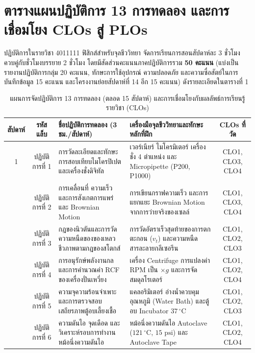 \chapter*{ตารางแผนปฏิบัติการ 13 การทดลอง และการเชื่อมโยง CLOs สู่ PLOs}

ปฏิบัติการในรายวิชา 4011111 ฟิสิกส์สำหรับจุลชีววิทยา จัดการเรียนการสอนสัปดาห์ละ 3 ชั่วโมง ควบคู่กับชั่วโมงบรรยาย 2 ชั่วโมง โดยมีสัดส่วนคะแนนภาคปฏิบัติการรวม \textbf{50 คะแนน} (แบ่งเป็น รายงานปฏิบัติการกลุ่ม 20 คะแนน, ทักษะการใช้อุปกรณ์ ความปลอดภัย และความซื่อสัตย์ในการบันทึกข้อมูล 15 คะแนน และโครงงานย่อยสัปดาห์ที่ 14 อีก 15 คะแนน) ดังรายละเอียดใน\mbox{ตารางที่} 1

\begin{table}[H]
\centering
\caption{แผนการจัดปฏิบัติการ 13 การทดลอง (ตลอด 15 สัปดาห์) และการเชื่อมโยงกับผลลัพธ์การเรียนรู้รายวิชา (CLOs)}
\scriptsize\setlength{\tabcolsep}{3.5pt}
\begin{tabularx}{\textwidth}{c c >{\raggedright\arraybackslash}p{4.4cm} >{\raggedright\arraybackslash}X c}
\toprule
\textbf{สัปดาห์} & \textbf{รหัสแล็บ} & \textbf{ชื่อปฏิบัติการทดลอง (3 ชม./สัปดาห์)} & \textbf{เครื่องมือจุลชีววิทยาและทักษะหลักที่ฝึก} & \textbf{CLOs ที่วัด} \\
\midrule
1 & ปฏิบัติการที่ 1 & การวัดละเอียดและทักษะการสอบเทียบไมโครปิเปตและเครื่องชั่งดิจิทัล & เวอร์เนียร์ ไมโครมิเตอร์ เครื่องชั่ง 4 ตำแหน่ง และ Micropipette (P200, P1000) & CLO1, CLO3, CLO4 \\
\addlinespace[1.5pt]
2 & ปฏิบัติการที่ 2 & การเคลื่อนที่ ความเร็ว และการสังเกตการแพร่และ Brownian Motion & การเขียนกราฟความเร็ว และการแยกแยะ Brownian Motion จากการว่ายจริงของเซลล์ & CLO1, CLO3, CLO4 \\
\addlinespace[1.5pt]
3 & ปฏิบัติการที่ 3 & กฎของนิวตันและการวัดความหนืดของของเหลวชีวภาพตามกฎของสโตกส์ & การวัดอัตราเร็วสุดท้ายของการตกตะกอน ($v_t$) และความหนืดสารละลายกลีเซอรีน & CLO1, CLO2, CLO3 \\
\addlinespace[1.5pt]
4 & ปฏิบัติการที่ 4 & การอนุรักษ์พลังงานกลและการคำนวณค่า RCF ของเครื่องปั่นเหวี่ยง & เครื่อง Centrifuge การแปลงค่า RPM เป็น $\times g$ และการจัดสมดุลโรเตอร์ & CLO1, CLO2, CLO4 \\
\addlinespace[1.5pt]
5 & ปฏิบัติการที่ 5 & ความจุความร้อนจำเพาะและการตรวจสอบเสถียรภาพตู้อบเลี้ยงเชื้อ & แคลอริมิเตอร์ อ่างน้ำควบคุมอุณหภูมิ (Water Bath) และตู้อบ Incubator $37\,^\circ\text{C}$ & CLO1, CLO2, CLO3 \\
\addlinespace[1.5pt]
6 & ปฏิบัติการที่ 6 & ความดันไอ จุดเดือด และวิเคราะห์รอบการทำงานหม้อนึ่งความดันไอ & หม้อนึ่งความดันไอ Autoclave ($121\,^\circ\text{C}$, $15\text{ psi}$) และ Autoclave Tape & CLO1, CLO2, CLO4 \\

\end{tabularx}
\end{table}
